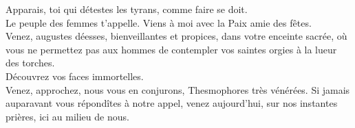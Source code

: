 \documentclass[12pt]{book}%
\newcommand{\passeLigne}[0]{\skipnumbering}%
\newcommand{\ligne}[1]{\setline{#1}\hidenumbering}%
\newcommand{\espace}[1]{\hspace{#1}}%
\newcommand{\francais}[1]{{\policeFr #1}}%
\newcommand{\chantChoeurFr}[1]{%
\hangindent=50pt%
\espace{30pt}%
\francais{#1%
}}%
\newenvironment{groupe}{%
\pstart%
\ledgroup%
}{%
\pend %
}%
\begin{document}
\begin{pages}
\begin{Rightside}
\begin{groupe}
\end{groupe}%
\begin{groupe}%
\chantChoeurFr{Apparais, toi qui détestes les tyrans, comme faire se doit.\\\passeLigne}
\end{groupe}%
\begin{groupe}%
\chantChoeurFr{Le peuple des femmes t'appelle.}
\end{groupe}%
\begin{groupe}%
\chantChoeurFr{Viens à moi avec}
\end{groupe}%
\begin{groupe}%
\chantChoeurFr{la Paix amie des fêtes.\\\passeLigne}
\end{groupe}%
\begin{groupe}%
\chantChoeurFr{\ligne{1148}Venez, augustes déesses, bienveillantes et propices,}
\end{groupe}%
\begin{groupe}%
\chantChoeurFr{dans votre enceinte sacrée,}
\end{groupe}%
\begin{groupe}%
\chantChoeurFr{où vous ne permettez pas aux hommes de contempler}
\end{groupe}%
\begin{groupe}%
\chantChoeurFr{vos saintes orgies à la lueur des torches.\\\passeLigne}
\end{groupe}%
\begin{groupe}%
\chantChoeurFr{Découvrez vos faces immortelles.\\\passeLigne}
\end{groupe}%
\begin{groupe}%
\chantChoeurFr{Venez, approchez, nous vous en conjurons,}
\end{groupe}%
\begin{groupe}%
\chantChoeurFr{Thesmophores très vénérées.}
\end{groupe}%
\begin{groupe}%
\chantChoeurFr{Si jamais auparavant vous répondîtes à notre appel,}
\end{groupe}%
\begin{groupe}%
\chantChoeurFr{\ligne{1159}venez aujourd'hui, sur nos instantes prières, ici au milieu de nous.\\\passeLigne}

\end{groupe}
\end{Rightside}
\end{pages}
\end{document}
